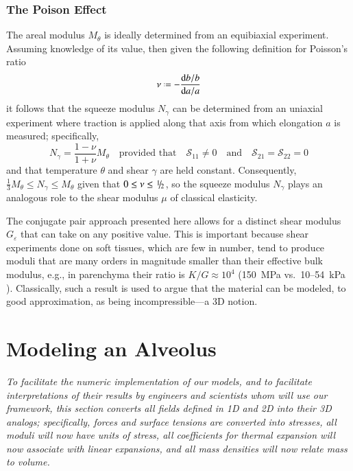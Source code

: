 \subsubsection{The Poison Effect}

The areal modulus $M_{\theta}$ is ideally determined from an equibiaxial experiment.  Assuming knowledge of its value, then given the following definition for Poisson's ratio
\begin{displaymath}
\nu \defeq - \frac{\mathrm{d}b / b}{\mathrm{d}a / a}
\end{displaymath}
it follows that the squeeze modulus $N_{\gamma}$ can be determined from an uniaxial experiment where traction is applied along that axis from which elongation $a$ is measured; specifically,
\begin{displaymath}
N_{\gamma} = \frac{1 - \nu}{1 + \nu} M_{\theta}
\quad \text{provided that} \quad
\mathcal{S}_{11} \neq 0 
\quad \text{and} \quad
\mathcal{S}_{21} = \mathcal{S}_{22} = 0 
\end{displaymath}
and that temperature $\theta$ and shear $\gamma$ are held constant.  Consequently, $\tfrac{1}{3} M_{\theta} \leq N_{\gamma} \leq M_{\theta}$ given that $0 \leq \nu \leq \textfrac{1}{2}$, so the squeeze modulus $N_{\gamma}$ plays an analogous role to the shear modulus $\mu$ of classical elasticity.  

The conjugate pair approach presented here allows for a distinct shear modulus $G_{\varepsilon}$ that can take on any positive value.  This is important because shear experiments done on soft tissues, which are few in number, tend to produce moduli that are many orders in magnitude smaller than their effective bulk modulus, e.g., in parenchyma their ratio is $K/G \approx 10^{4}$ (150~MPa vs.\ 10--54~kPa \cite{Sarafetal07}).  Classically, such a result is used to argue that the material can be modeled, to  good approximation, as being incompressible---a 3D notion.

\section{Modeling an Alveolus}
\label{secAlveolus}

\textit{To facilitate the numeric implementation of our models, and to facilitate interpretations of their results by engineers and scientists whom will use our framework, this section converts all fields defined in 1D and 2D into their 3D analogs; specifically, forces and surface tensions are converted into stresses, all moduli will now have units of stress, all coefficients for thermal expansion will now associate with linear expansions, and all mass densities will now relate mass to volume.}

